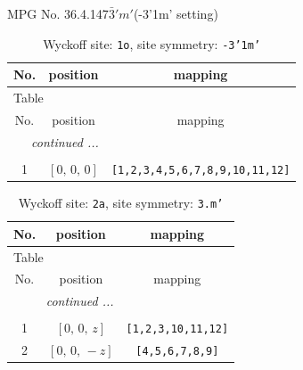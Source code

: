 \documentclass[fleqn,8pt]{jsarticle}
\begin{document}
\setcounter{MaxMatrixCols}{32}

\renewcommand{\tablename}{Table~}
\renewcommand{\figurename}{Figure~}
\begin{center}
\LARGE
MPG No. 36.4.147\quad$\bar{3}'m'$\quad(-3'1m' setting)
\end{center}
\renewcommand{\arraystretch}{1.2}
\begin{longtable}{ccc}
\caption{Wyckoff site: {\tt 1o}, site symmetry: {\tt -3'1m'}}
 \\
 \hline \hline
No. & position & mapping \\ \hline \endfirsthead

\multicolumn{2}{l}{\tablename\ \thetable{}} \\
 \hline \hline
No. & position & mapping \\ \hline \endhead

 \hline \hline
\multicolumn{2}{r}{\footnotesize\it continued ...} \\ \endfoot

 \hline \hline
\multicolumn{2}{r}{} \\ \endlastfoot

1 & $\left[ 0,\, 0,\, 0 \right]$ & {\tt [1,2,3,4,5,6,7,8,9,10,11,12]} \\
\end{longtable}
\renewcommand{\arraystretch}{1.2}
\begin{longtable}{ccc}
\caption{Wyckoff site: {\tt 2a}, site symmetry: {\tt 3.m'}}
 \\
 \hline \hline
No. & position & mapping \\ \hline \endfirsthead

\multicolumn{2}{l}{\tablename\ \thetable{}} \\
 \hline \hline
No. & position & mapping \\ \hline \endhead

 \hline \hline
\multicolumn{2}{r}{\footnotesize\it continued ...} \\ \endfoot

 \hline \hline
\multicolumn{2}{r}{} \\ \endlastfoot

1 & $\left[ 0,\, 0,\, z \right]$ & {\tt [1,2,3,10,11,12]} \\ \hline
2 & $\left[ 0,\, 0,\, - z \right]$ & {\tt [4,5,6,7,8,9]} \\
\end{longtable}
\renewcommand{\arraystretch}{1.2}
\end{document}
